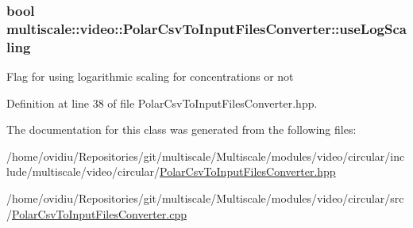 \hypertarget{classmultiscale_1_1video_1_1PolarCsvToInputFilesConverter_af07bf56fc39bb226a6e2596f35ada0d7}{
\subsubsection[{use\-Log\-Scaling}]{\setlength{\rightskip}{0pt plus 5cm}bool {\bf multiscale\-::video\-::\-Polar\-Csv\-To\-Input\-Files\-Converter\-::use\-Log\-Scaling}}}\label{classmultiscale_1_1video_1_1PolarCsvToInputFilesConverter_af07bf56fc39bb226a6e2596f35ada0d7}
\-Flag for using logarithmic scaling for concentrations or not 

\-Definition at line 38 of file \-Polar\-Csv\-To\-Input\-Files\-Converter.\-hpp.



\-The documentation for this class was generated from the following files\-:\begin{DoxyCompactItemize}
\item 
/home/ovidiu/\-Repositories/git/multiscale/\-Multiscale/modules/video/circular/include/multiscale/video/circular/\hyperlink{PolarCsvToInputFilesConverter_8hpp}{\-Polar\-Csv\-To\-Input\-Files\-Converter.\-hpp}\item 
/home/ovidiu/\-Repositories/git/multiscale/\-Multiscale/modules/video/circular/src/\hyperlink{PolarCsvToInputFilesConverter_8cpp}{\-Polar\-Csv\-To\-Input\-Files\-Converter.\-cpp}\end{DoxyCompactItemize}
